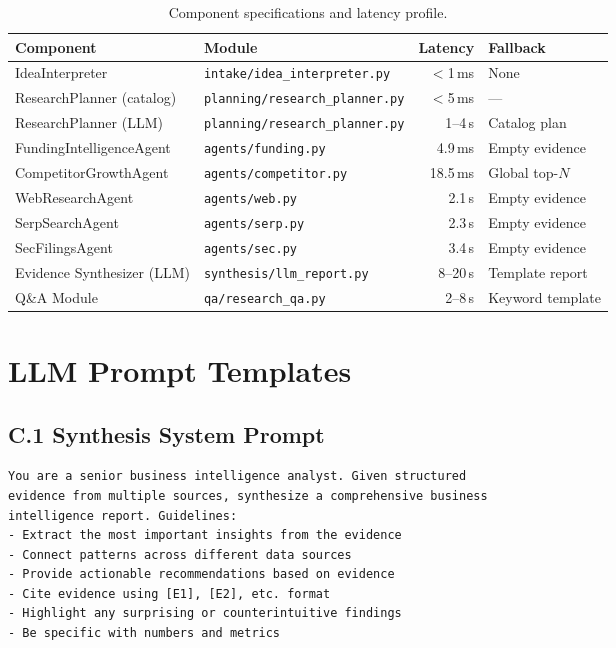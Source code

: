\documentclass[preprint,12pt]{elsarticle}
\begin{document}
\begin{table}[!t]
\small
\centering
\caption{Component specifications and latency profile.}
\label{tab:components}
\begin{tabular}{p{4.6cm} p{5.2cm} r p{3.4cm}}
\toprule
\textbf{Component} & \textbf{Module} & \textbf{Latency} & \textbf{Fallback} \\
\midrule
IdeaInterpreter           & \texttt{intake/idea\_interpreter.py}    & $<$1\,ms  & None \\
ResearchPlanner (catalog) & \texttt{planning/research\_planner.py}  & $<$5\,ms  & --- \\
ResearchPlanner (LLM)     & \texttt{planning/research\_planner.py}  & 1--4\,s   & Catalog plan \\
FundingIntelligenceAgent  & \texttt{agents/funding.py}              & 4.9\,ms   & Empty evidence \\
CompetitorGrowthAgent     & \texttt{agents/competitor.py}           & 18.5\,ms  & Global top-$N$ \\
WebResearchAgent          & \texttt{agents/web.py}                  & 2.1\,s    & Empty evidence \\
SerpSearchAgent           & \texttt{agents/serp.py}                 & 2.3\,s    & Empty evidence \\
SecFilingsAgent           & \texttt{agents/sec.py}                  & 3.4\,s    & Empty evidence \\
Evidence Synthesizer (LLM)& \texttt{synthesis/llm\_report.py}       & 8--20\,s  & Template report \\
Q\&A Module               & \texttt{qa/research\_qa.py}             & 2--8\,s   & Keyword template \\
\bottomrule
\end{tabular}
\end{table}

\section{LLM Prompt Templates}

\subsection*{C.1 Synthesis System Prompt}
\begin{verbatim}
You are a senior business intelligence analyst. Given structured
evidence from multiple sources, synthesize a comprehensive business
intelligence report. Guidelines:
- Extract the most important insights from the evidence
- Connect patterns across different data sources
- Provide actionable recommendations based on evidence
- Cite evidence using [E1], [E2], etc. format
- Highlight any surprising or counterintuitive findings
- Be specific with numbers and metrics
\end{verbatim}
\end{document}
